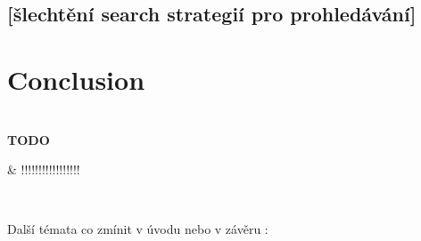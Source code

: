 \documentclass[12pt,a4paper]{report}
\newenvironment{todo}
{ ~\\[0.5em]
  {\color{red}\textbf{TODO}}
  \begin{easylist}[itemize]}
{ \end{easylist}
  ~}
\begin{document}
\section{[šlechtění search strategií pro prohledávání]}




\chapter*{Conclusion}


\begin{todo}
 & !!!!!!!!!!!!!!!!!
\end{todo}


Další témata co zmínit v úvodu nebo v závěru :\\
\end{document}
